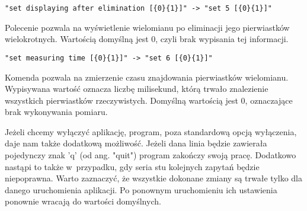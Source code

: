 \begin{lstlisting}
"set displaying after elimination [{0}{1}]" -> "set 5 [{0}{1}]"
\end{lstlisting}

Polecenie pozwala na wyświetlenie wielomianu po eliminacji jego pierwiastków wielokrotnych. Wartością domyślną jest $0$, czyli brak wypisania tej informacji.

\begin{lstlisting}
"set measuring time [{0}{1}]" -> "set 6 [{0}{1}]"
\end{lstlisting}

Komenda pozwala na zmierzenie czasu znajdowania pierwiastków wielomianu. Wypisywana wartość oznacza liczbę milisekund, którą trwało znalezienie wszystkich pierwiastków rzeczywistych. Domyślną wartością jest $0$, oznaczające brak wykonywania pomiaru.

Jeżeli chcemy wyłączyć aplikację, program, poza standardową opcją wyłączenia, daje nam także dodatkową możliwość. Jeżeli dana linia będzie zawierała pojedynczy znak 'q' (od ang. "quit") program zakończy swoją pracę. Dodatkowo nastąpi to także w~przypadku, gdy seria stu kolejnych zapytań będzie niepoprawna. Warto zaznaczyć, że wszystkie dokonane zmiany są trwałe tylko dla danego uruchomienia aplikacji. Po ponownym uruchomieniu ich ustawienia ponownie wracają do wartości domyślnych.
